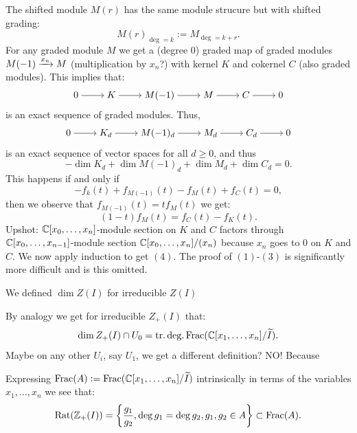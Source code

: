 \documentclass[11pt,a4paper]{article}
\begin{document}
\begin{definition}
  The shifted module $M(r)$ has the same module strucure but with shifted
  grading:
  \[
    M(r)_{\deg = k} := M_{\deg = k + r}.
  \]
  For any graded module $M$ we get a (degree $0$) graded map
  of graded modules $M(-1) \xrightarrow{x_n} M$ (multiplication by $x_n$?)
  with kernel $K$ and cokernel $C$ (also graded modules).
  This implies that:
  \[\begin{tikzcd}[ampersand replacement=\&,cramped]
	0 \& K \& {M(-1)} \& M \& C \& 0
	\arrow[from=1-1, to=1-2]
	\arrow[from=1-2, to=1-3]
	\arrow[from=1-3, to=1-4]
	\arrow[from=1-4, to=1-5]
	\arrow[from=1-5, to=1-6]
\end{tikzcd}\]
  is an exact sequence of graded modules.
  Thus,
  \[\begin{tikzcd}[ampersand replacement=\&,cramped]
	0 \& K_d \& {M(-1)_d} \& M_d \& C_d \& 0
	\arrow[from=1-1, to=1-2]
	\arrow[from=1-2, to=1-3]
	\arrow[from=1-3, to=1-4]
	\arrow[from=1-4, to=1-5]
	\arrow[from=1-5, to=1-6]
\end{tikzcd}\]
  is an exact sequence of vector spaces for all $d \geq 0$,
  and thus
  \[
    -\dim K_d + \dim M(-1)_d + \dim M_d + \dim C_d = 0.
  \]
  This happens if and only if
  \[
    -f_k(t) + f_{M(-1)}(t) - f_M(t) + f_C(t) = 0,
  \]
  then we observe that $f_{M(-1)}(t) = t f_M(t)$ we get:
  \[
    (1 - t) f_M(t) = f_C(t) - f_K(t).
  \]
  Upshot: $\mathbb{C}[x_0,\dots,x_n]$-module section on $K$ and $C$ factors
  through $\mathbb{C}[x_0,\dots,x_{n-1}]$-module section $\mathbb{C}[x_0,\dots,x_n] / (x_n)$
  because $x_n$ goes to $0$ on $K$ and $C$.
  We now apply induction to get $(4)$.
  The proof of $(1)$-$(3)$ is significantly more difficult and is this omitted.
\end{definition}

\begin{remark}
  We defined $\dim Z(I)$
  for irreducible $Z(I)$ %

  By analogy we get for irreducible $Z_+(I)$
  that:
  \[
    \dim Z_+(I) \cap U_0 = \operatorname{tr.deg.} \operatorname{Frac}(\mathbb{C}[x_1,\dots,x_n]/\widetilde I).
  \]
  Maybe on any other $U_i$, say $U_1$, we get a different definition? NO!
  Because %
\end{remark}

\begin{remark}
  Expressing $\operatorname{Frac}(A) := \operatorname{Frac}(\mathbb{C}[x_1,\dots,x_n]/\widetilde I)$
  intrinsically in terms of the variables $x_1,\dots,x_n$ we see that:
  \[
    \operatorname{Rat}(\mathbb{Z}_+(I)) = \left\{\frac{g_1}{g_2}, \deg g_1 = \deg g_2, g_1,g_2 \in A\right\}
    \subset \operatorname{Frac}(A).
  \]
\end{remark}
\end{document}
